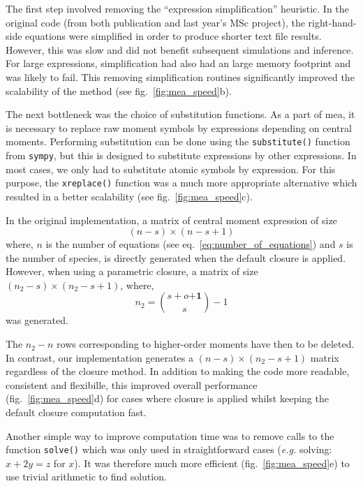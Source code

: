 \documentclass[11pt,a4paper]{article}
\newcommand{\sympy}{\texttt{sympy}}
\newcommand{\eg}{\emph{e.g.}}
\begin{document}
The first step involved removing the ``expression simplification'' heuristic.
In the original code (from both publication\cite{ale_general_2013} and last year's MSc project\cite{babtie_moment_2013}), 
the right-hand-side equations were simplified in order to produce shorter text file results.
However, this was slow and did not benefit subsequent simulations and inference.
For large expressions, simplification had also had an large memory footprint and was likely to fail.
This removing simplification routines significantly improved the scalability of the method (see fig.~\ref{fig:mea_speed}b).

The next bottleneck was the choice of substitution functions.
As a part of \gls{mea}, it is necessary to replace raw moment symbols by expressions depending on central moments.
Performing substitution can be done using the \texttt{substitute()} function from \sympy, but this is designed to substitute expressions by other expressions.
In most cases, we only had to substitute atomic symbols by expression.
For this purpose, the \texttt{xreplace()} function was a much more appropriate alternative which resulted in a better scalability (see fig.~\ref{fig:mea_speed}c).

In the original implementation, a matrix of central moment expression of size
\[(n-s) \times (n-s + 1)\]
where,
$n$ is the number of equations (see eq.~\ref{eq:number_of_equations}) and
$s$ is the number of species,
is directly generated when the default closure is applied.
However, when using a parametric closure, a matrix of size $(n_2-s) \times (n_2-s + 1)$,
where,
\[n_2={{s+o \mathbf{+1}} \choose {s}} -1\]
was generated.

The $n_2 - n$ rows corresponding to higher-order moments have then to be deleted.
In contrast, our implementation generates a $(n-s) \times (n_2-s + 1)$ matrix regardless of the closure method.
In addition to making the code more readable, consistent and flexibille, this improved overall performance (fig.~\ref{fig:mea_speed}d) 
for cases where closure is applied whilst keeping the default closure computation fast.

Another simple way to improve computation time was to remove calls to the function \texttt{solve()} which was only used in straightforward cases
(\eg{} solving: $x + 2y = z$ for $x$).
It was therefore much more efficient (fig.~\ref{fig:mea_speed}e) to use trivial arithmetic to find solution.
\end{document}
